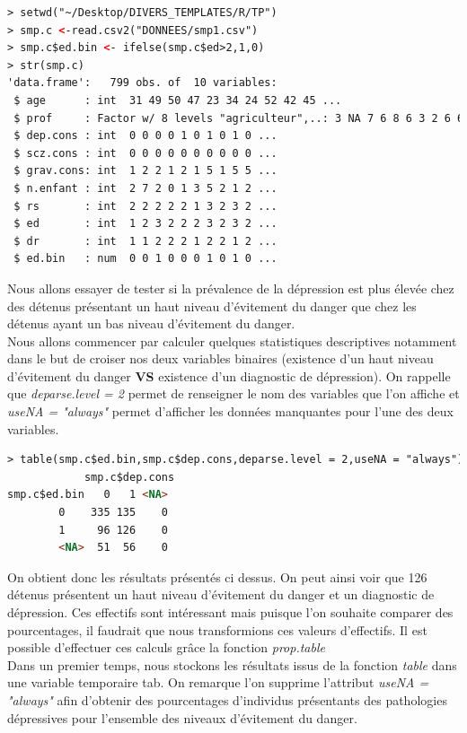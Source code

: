 \begin{lstlisting}[language=html]
> setwd("~/Desktop/DIVERS_TEMPLATES/R/TP")
> smp.c <-read.csv2("DONNEES/smp1.csv")
> smp.c$ed.bin <- ifelse(smp.c$ed>2,1,0)
> str(smp.c)
'data.frame':	799 obs. of  10 variables:
 $ age      : int  31 49 50 47 23 34 24 52 42 45 ...
 $ prof     : Factor w/ 8 levels "agriculteur",..: 3 NA 7 6 8 6 3 2 6 6 ...
 $ dep.cons : int  0 0 0 0 1 0 1 0 1 0 ...
 $ scz.cons : int  0 0 0 0 0 0 0 0 0 0 ...
 $ grav.cons: int  1 2 2 1 2 1 5 1 5 5 ...
 $ n.enfant : int  2 7 2 0 1 3 5 2 1 2 ...
 $ rs       : int  2 2 2 2 2 1 3 2 3 2 ...
 $ ed       : int  1 2 3 2 2 2 3 2 3 2 ...
 $ dr       : int  1 1 2 2 2 1 2 2 1 2 ...
 $ ed.bin   : num  0 0 1 0 0 0 1 0 1 0 ...
\end{lstlisting}
Nous allons essayer de tester si la prévalence de la dépression est plus élevée chez des détenus présentant un haut niveau d'évitement du danger que chez les détenus ayant un bas niveau d'évitement du danger.\newline
\\
Nous allons commencer par calculer quelques statistiques descriptives notamment dans le but de croiser nos deux variables binaires (existence d'un haut niveau d'évitement du danger \textbf{VS} existence d'un diagnostic de dépression).
On rappelle que \textit{deparse.level = 2} permet de renseigner le nom des variables que l'on affiche et \textit{useNA = "always"} permet d'afficher les données manquantes pour l'une des deux variables.\newline
\begin{lstlisting}[language=html]
> table(smp.c$ed.bin,smp.c$dep.cons,deparse.level = 2,useNA = "always")
            smp.c$dep.cons
smp.c$ed.bin   0   1 <NA> 
        0    335 135    0
        1     96 126    0
        <NA>  51  56    0
\end{lstlisting}
On obtient donc les résultats présentés ci dessus. On peut ainsi voir que 126 détenus présentent un haut niveau d'évitement du danger et un diagnostic de dépression.\newline
Ces effectifs sont intéressant mais puisque l'on souhaite comparer des pourcentages, il faudrait que nous transformions ces valeurs d'effectifs.\newline
Il est possible d'effectuer ces calculs grâce la fonction \textit{prop.table}\newline
\\
Dans un premier temps, nous stockons les résultats issus de la fonction \textit{table} dans une variable temporaire tab. On remarque l'on supprime l'attribut \textit{useNA = "always"} afin d'obtenir des pourcentages d'individus présentants des pathologies dépressives pour l'ensemble des niveaux d'évitement du danger.
